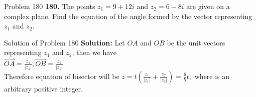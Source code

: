 \documentclass[aspectratio=169,8pt]{beamer}
\begin{document}
\begin{frame}{Problem 180}
  \textbf{180.} The points $z_1 = 9 + 12i$ and $z_2 = 6 - 8i$ are given on a complex plane. Find the equation of the angle formed
  by the vector representing $z_1$ and $z_2$.
\end{frame}
\begin{frame}{Solution of Problem 180}
  \textbf{Solution:} Let $OA$ and $OB$ be the unit vectors representing $z_1$ and $z_2$, then we have\\
  \vspace*{0.2cm}
  $\vec{OA} = \frac{z_1}{|z_1|}, \vec{OB} = \frac{z_2}{|z_2|}$\\
  \vspace*{0.2cm}
  Therefore equation of bisector will be $z = t\left(\frac{z_1}{|z_1|} + \frac{z_2}{|z_2|}\right) = \frac{6}{5}t,$ where is an
  arbitrary positive integer.
\end{frame}
\end{document}
